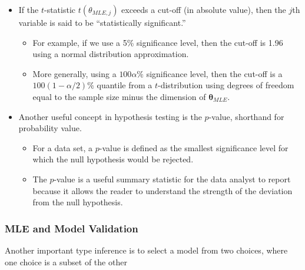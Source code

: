 \documentclass[]{book}
\theoremstyle{definition}
\theoremstyle{definition}
\theoremstyle{definition}
\theoremstyle{remark}
\begin{document}
\begin{itemize}
\item
  If the \(t\)-statistic \(t(\theta_{MLE,j})\) exceeds a cut-off (in
  absolute value), then the \(j\)th variable is said to be
  ``statistically significant.''

  \begin{itemize}
  \item
    For example, if we use a 5\% significance level, then the cut-off is
    1.96 using a normal distribution approximation.
  \item
    More generally, using a \(100 \alpha \%\) significance level, then
    the cut-off is a \(100(1-\alpha/2)\%\) quantile from a
    \(t\)-distribution using degrees of freedom equal to the sample size
    minus the dimension of \(\boldsymbol \theta_{MLE}\).
  \end{itemize}
\item
  Another useful concept in hypothesis testing is the \(p\)-value,
  shorthand for probability value.

  \begin{itemize}
  \item
    For a data set, a \(p\)-value is defined as the smallest
    significance level for which the null hypothesis would be rejected.
  \item
    The \(p\)-value is a useful summary statistic for the data analyst
    to report because it allows the reader to understand the strength of
    the deviation from the null hypothesis.
  \end{itemize}
\end{itemize}

\subsubsection{MLE and Model Validation}\label{mle-and-model-validation}

Another important type inference is to select a model from two choices,
where one choice is a subset of the other
\end{document}
